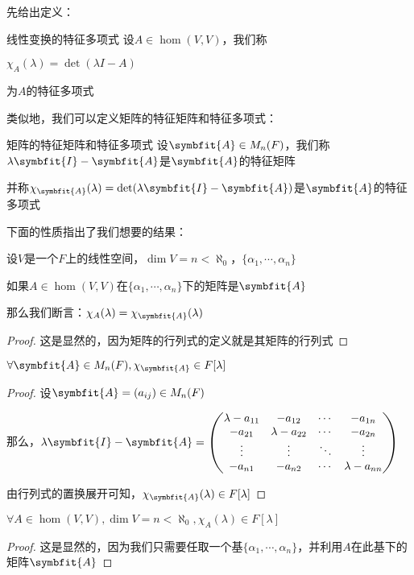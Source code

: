 \documentclass[12pt, a4paper, oneside, UTF8]{ctexbook}
\begin{document}
			先给出定义：
			\begin{defn}{线性变换的特征多项式}{}
				设$A \in \hom(V,V)$，我们称

				$\chi_A(\lambda )=\det(\lambda I-A)$

				为$A$的特征多项式
			\end{defn}
			类似地，我们可以定义矩阵的特征矩阵和特征多项式：
			\begin{defn}{矩阵的特征矩阵和特征多项式}{}
				设$\symbfit{A}\in M_n(F)$，我们称$\lambda \symbfit{I}-\symbfit{A}$是$\symbfit{A}$的特征矩阵

				并称$\chi_{\symbfit{A}}(\lambda )=\det(\lambda \symbfit{I}-\symbfit{A})$是$\symbfit{A}$的特征多项式
			\end{defn}
			下面的性质指出了我们想要的结果：
			\begin{para}{0}
				\point{}
					\begin{proposition}
						设$V$是一个$F$上的线性空间，$\dim V = n < \aleph_0$，$\{\alpha_1,\cdots,\alpha_n\}$

						如果$A \in \hom(V,V)$在$\{\alpha_1,\cdots,\alpha_n\}$下的矩阵是$\symbfit{A}$

						那么我们断言：$\chi_A(\lambda )=\chi_{\symbfit{A}}(\lambda )$
					\end{proposition}
					\begin{proof}
						这是显然的，因为矩阵的行列式的定义就是其矩阵的行列式
					\end{proof}
				\point{}
					\begin{proposition}
						$\forall \symbfit{A} \in M_n(F),\chi_{\symbfit{A}}\in F[\lambda ]$
					\end{proposition}
					\begin{proof}
						设$\symbfit{A}=(a_{ij})\in M_n(F)$

						那么，$\lambda\symbfit{I}-\symbfit{A}=\begin{pmatrix}
							\lambda-a_{11} & -a_{12} & \cdots & -a_{1n} \\
							-a_{21} & \lambda-a_{22} & \cdots & -a_{2n} \\
							\vdots & \vdots & \ddots & \vdots \\
							-a_{n1} & -a_{n2} & \cdots & \lambda-a_{nn}
						\end{pmatrix}$

						由行列式的置换展开可知，$\chi_{\symbfit{A}}(\lambda )\in F[\lambda ]$
					\end{proof}
					\begin{corollary}{}{}
						$\forall A \in \hom(V,V),\dim V = n < \aleph_0,\chi_A(\lambda )\in F[\lambda ]$
					\end{corollary}
					\begin{proof}
						这是显然的，因为我们只需要任取一个基$\{\alpha_1,\cdots,\alpha_n\}$，并利用$A$在此基下的矩阵$\symbfit{A}$


\end{proof}
\end{para}
\end{document}
